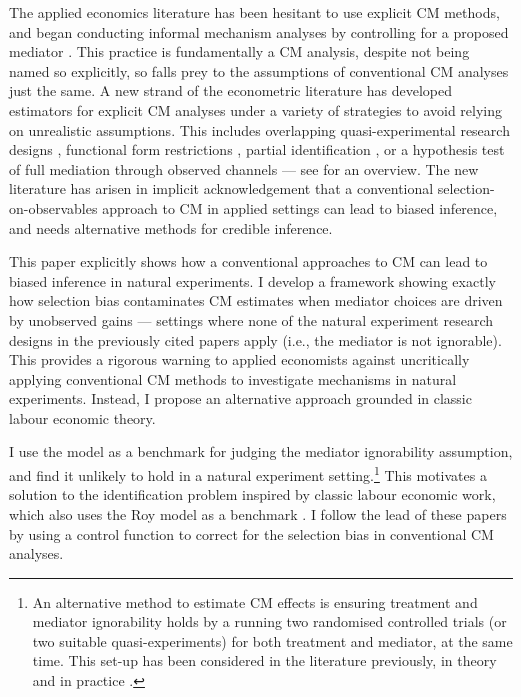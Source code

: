 The applied economics literature has been hesitant to use explicit CM methods, and began conducting informal mechanism analyses by controlling for a proposed mediator \citep{blackwell2024assumption}.
This practice is fundamentally a CM analysis, despite not being named so explicitly, so falls prey to the assumptions of conventional CM analyses just the same.
A new strand of the econometric literature has developed estimators for explicit CM analyses under a variety of strategies to avoid relying on unrealistic assumptions.
This includes overlapping quasi-experimental research designs \citep{deuchert2019direct,frolich2017direct}, functional form restrictions \citep{heckman2015econometric}, partial identification \citep{flores2009identification}, or a hypothesis test of full mediation through observed channels \citep{kwon2024testing} --- see \cite{huber2019review} for an overview.
The new literature has arisen in implicit acknowledgement that a conventional selection-on-observables approach to CM in applied settings can lead to biased inference, and needs alternative methods for credible inference.

This paper explicitly shows how a conventional approaches to CM can lead to biased inference in natural experiments.
I develop a framework showing exactly how selection bias contaminates CM estimates when mediator choices are driven by unobserved gains --- settings where none of the natural experiment research designs in the previously cited papers apply (i.e., the mediator is not ignorable).
This provides a rigorous warning to applied economists against uncritically applying conventional CM methods to investigate mechanisms in natural experiments.
Instead, I propose an alternative approach grounded in classic labour economic theory.

I use the \cite{roy1951some} model as a benchmark for judging the \cite{imai2010identification} mediator ignorability assumption, and find it unlikely to hold in a natural experiment setting.\footnote{
    An alternative method to estimate CM effects is ensuring treatment and mediator ignorability holds by a running two randomised controlled trials (or two suitable quasi-experiments) for both treatment and mediator, at the same time.
    This set-up has been considered in the literature previously, in theory \citep{imai2013experimental,heckman2015econometric} and in practice \citep{ludwig2011mechanism,heckman2013understanding}.
}
This motivates a solution to the identification problem inspired by classic labour economic work, which also uses the Roy model as a benchmark \citep{heckman1979sample,heckman1990empirical}.
I follow the lead of these papers by using a control function to correct for the selection bias in conventional CM analyses.

